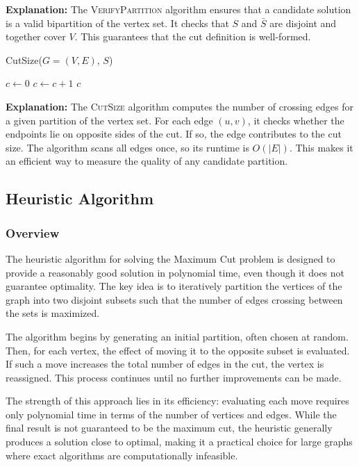\documentclass[12pt]{article}
\begin{document}
\noindent
\textbf{Explanation:} The \textsc{VerifyPartition} algorithm ensures that a candidate 
solution is a valid bipartition of the vertex set. It checks that $S$ and $\bar{S}$ 
are disjoint and together cover $V$. This guarantees that the cut definition is 
well-formed. 
\begin{algorithm}[H]
\caption{CutSize($G=(V,E)$, $S$)}
\begin{algorithmic}[1]
\State $c \gets 0$ 
        \State $c \gets c+1$
    \EndIf
\EndFor
\State \Return $c$
\end{algorithmic}
\end{algorithm}
\noindent
\textbf{Explanation:} The \textsc{CutSize} algorithm computes the number of crossing 
edges for a given partition of the vertex set. For each edge $(u,v)$, it checks 
whether the endpoints lie on opposite sides of the cut. If so, the edge contributes 
to the cut size. The algorithm scans all edges once, so its runtime is $O(|E|)$. 
This makes it an efficient way to measure the quality of any candidate partition.
\subsection{Heuristic Algorithm}
\label{sec:heuristic-desc}
\subsubsection{Overview}
The heuristic algorithm for solving the Maximum Cut problem is designed to provide 
a reasonably good solution in polynomial time, even though it does not guarantee 
optimality. The key idea is to iteratively partition the vertices of the graph 
into two disjoint subsets such that the number of edges crossing between the sets 
is maximized. 

The algorithm begins by generating an initial partition, often chosen at random. 
Then, for each vertex, the effect of moving it to the opposite subset is evaluated. 
If such a move increases the total number of edges in the cut, the vertex is reassigned. 
This process continues until no further improvements can be made. 

The strength of this approach lies in its efficiency: evaluating each move requires 
only polynomial time in terms of the number of vertices and edges. While the final 
result is not guaranteed to be the maximum cut, the heuristic generally produces 
a solution close to optimal, making it a practical choice for large graphs where 
exact algorithms are computationally infeasible.
\end{document}

